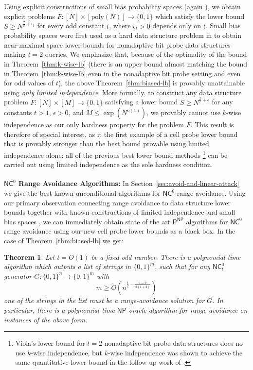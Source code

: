 \documentclass[11pt]{article}
\newtheorem{theorem}{Theorem}
\newcommand{\B}{\{0,1\}}
\newcommand{\poly}{\mathrm{poly}}
\begin{document}
Using explicit constructions of small bias probability spaces (again \cite{naornaor}), we obtain explicit problems $F: [N] \times [\poly(N)] \to \B$ which satisfy the lower bound $S \geq N^{\frac{2}{t} + \epsilon_t}$ for every odd constant $t$, where $\epsilon_t>0$ depends only on $t$. Small bias probability spaces were first used as a hard data structure problem in \cite{viola-maximal} to obtain near-maximal space lower bounds for nonadaptive bit probe data structures making $t=2$ queries. 
We emphasize that, because of the optimality of the bound in Theorem~\ref{thm:k-wise-lb} (there is an upper bound almost matching the bound in Theorem~\ref{thm:k-wise-lb} even in the nonadaptive bit probe setting and even for odd values of $t$), the above Theorem~\ref{thm:biased-lb} is provably unattainable using \emph{only limited independence}. More formally, to construct any data structure problem $F: [N] \times [M] \to \B$ satisfying a lower bound $S \geq N^{\frac{2}{t} + \epsilon}$ for any constants $t > 1$, $\epsilon>0$, and $M \leq \exp(N^{o(1)})$, we provably cannot use $k$-wise independence as our only hardness property for the problem $F$. This result is therefore of special interest, as it the first example of a cell probe lower bound that is provably stronger than the best bound provable using limited independence alone: all of the previous best lower bound methods \cite{Siegel89,panigrahy,kasper,viola-maximal,golovnev}\footnote{Viola's lower bound for $t=2$ nonadaptive bit probe data structures \cite{viola-maximal} does no use $k$-wise independence, but $k$-wise independence was shown to achieve the same quantitative lower bound in the follow up work of \cite{golovnev}.} can be carried out using limited independence as the sole hardness condition.
~\\~\\
{\bf \noindent $\mathsf{NC}^0$ Range Avoidance Algorithms:}
In Section~\ref{sec:avoid-and-linear-attack} we give the best known unconditional algorithms for $\mathsf{NC}^0$ range avoidance. Using our primary observation connecting range avoidance to data structure lower bounds together with known constructions of limited independence and small bias spaces \cite{naornaor}, we can immediately obtain state of the art $\mathsf{P^{NP}}$ algorithms for $\mathsf{NC}^0$ range avoidance using our new cell probe lower bounds as a black box. In the case of Theorem~\ref{thm:biased-lb} we get:

\begin{theorem}
\label{thm:pnp-avoid-odd}
Let $t = O(1)$ be a fixed odd number. There is a polynomial time algorithm which outputs a list of strings in $\{0,1\}^m$, such that for any $\mathsf{NC}^0_t$ generator $G: \B^n \to \B^m$ with
\[
m \geq  \tilde{O}( n^{\frac{t}{2} - \frac{t-2}{2(t+2)}})
\]
one of the strings in the list must be a range-avoidance solution for $G$. In particular, there is a polynomial time $\mathsf{NP}$-oracle algorithm for range avoidance on instances of the above form.
\end{theorem}
\end{document}
